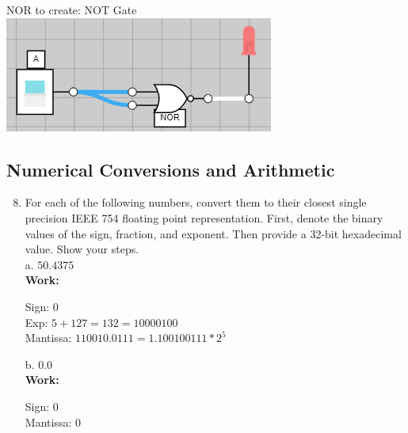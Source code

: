 \documentclass[11pt]{article}
\begin{document}
\begin{enumerate}
    NOR to create: NOT Gate\\
    \includegraphics[scale=1]{not}
\end{enumerate}

\subsection{Numerical Conversions and Arithmetic}
\begin{enumerate}
    \setcounter{enumi}{7}
    \item For each of the following numbers, convert them to their closest single precision IEEE 754
    floating point representation. First, denote the binary values of the sign, fraction, and exponent. Then provide a 32-bit hexadecimal value. Show your steps.\\
    a. $50.4375$\\
    \textbf{Work:}
    \begin{center}
        Sign: $0$\\
        Exp: $5 + 127 = 132 = 10000100$\\
        Mantissa: $110010.0111 = 1.100100111 * 2^5$\\
    \end{center}
    b. $0.0$\\
    \textbf{Work:}
    \begin{center}
        Sign: $0$\\
        Mantissa: $0$\\
\end{center}
\end{enumerate}
\end{document}
